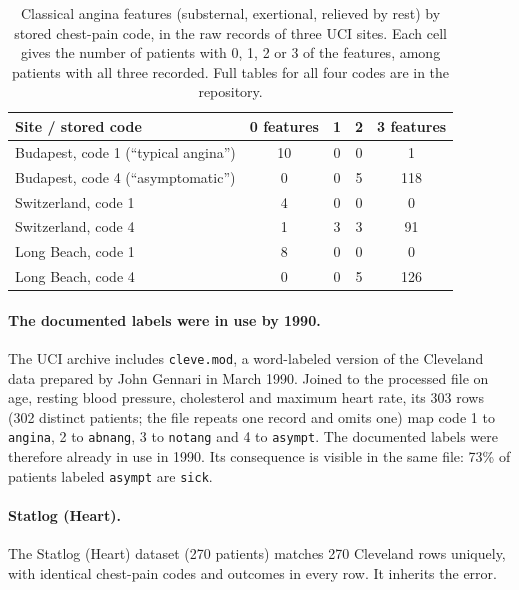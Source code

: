\documentclass[11pt]{article}
\begin{document}
\begin{table}[t]
\centering
\caption{Classical angina features (substernal, exertional, relieved by rest) by stored chest-pain code, in the raw records of three UCI sites. Each cell gives the number of patients with 0, 1, 2 or 3 of the features, among patients with all three recorded. Full tables for all four codes are in the repository.}\label{tab:raw}
\begin{tabular}{lcccc}
\toprule
Site / stored code & 0 features & 1 & 2 & 3 features\\
\midrule
Budapest, code 1 (``typical angina'') & 10 & 0 & 0 & 1\\
Budapest, code 4 (``asymptomatic'') & 0 & 0 & 5 & 118\\
Switzerland, code 1 & 4 & 0 & 0 & 0\\
Switzerland, code 4 & 1 & 3 & 3 & 91\\
Long Beach, code 1 & 8 & 0 & 0 & 0\\
Long Beach, code 4 & 0 & 0 & 5 & 126\\
\bottomrule
\end{tabular}
\end{table}

\paragraph{The documented labels were in use by 1990.}
The UCI archive includes \texttt{cleve.mod}, a word-labeled version of the Cleveland data prepared by John Gennari in March 1990. Joined to the processed file on age, resting blood pressure, cholesterol and maximum heart rate, its 303 rows (302 distinct patients; the file repeats one record and omits one) map code 1 to \texttt{angina}, 2 to \texttt{abnang}, 3 to \texttt{notang} and 4 to \texttt{asympt}. The documented labels were therefore already in use in 1990. %
Its consequence is visible in the same file: 73\% of patients labeled \texttt{asympt} are \texttt{sick}.

\paragraph{Statlog (Heart).}
The Statlog (Heart) dataset \cite{ucistatlog} (270 patients) matches 270 Cleveland rows uniquely, with identical chest-pain codes and outcomes in every row. It inherits the error. %
\end{document}
